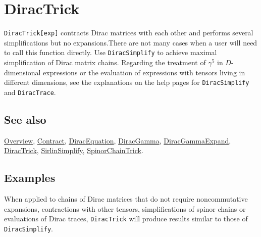 \documentclass[../FeynCalcManual.tex]{subfiles}
\begin{document}
\hypertarget{diractrick}{%
\section{DiracTrick}\label{diractrick}}

\texttt{DiracTrick[\allowbreak{}exp]} contracts Dirac matrices with each
other and performs several simplifications but no expansions.There are
not many cases when a user will need to call this function directly. Use
\texttt{DiracSimplify} to achieve maximal simplification of Dirac matrix
chains. Regarding the treatment of \(\gamma^5\) in \(D\)-dimensional
expressions or the evaluation of expressions with tensors living in
different dimensions, see the explanations on the help pages for
\texttt{DiracSimplify} and \texttt{DiracTrace}.

\subsection{See also}

\hyperlink{toc}{Overview}, \hyperlink{contract}{Contract},
\hyperlink{diracequation}{DiracEquation},
\hyperlink{diracgamma}{DiracGamma},
\hyperlink{diracgammaexpand}{DiracGammaExpand},
\hyperlink{diractrick}{DiracTrick},
\hyperlink{sirlinsimplify}{SirlinSimplify},
\hyperlink{spinorchaintrick}{SpinorChainTrick}.

\subsection{Examples}

When applied to chains of Dirac matrices that do not require
noncommutative expansions, contractions with other tensors,
simplifications of spinor chains or evaluations of Dirac traces,
\texttt{DiracTrick} will produce results similar to those of
\texttt{DiracSimplify}.

\begin{Shaded}
\begin{Highlighting}[]
\OperatorTok{[}\SpecialCharTok{\textbackslash{}}\OperatorTok{[}\OperatorTok{],} \SpecialCharTok{\textbackslash{}}\OperatorTok{[}\OperatorTok{],} \SpecialCharTok{\textbackslash{}}\OperatorTok{[}\OperatorTok{]]} 
 
\OperatorTok{[}\SpecialCharTok{\%}\OperatorTok{]}
\end{Highlighting}
\end{Shaded}
\end{document}
